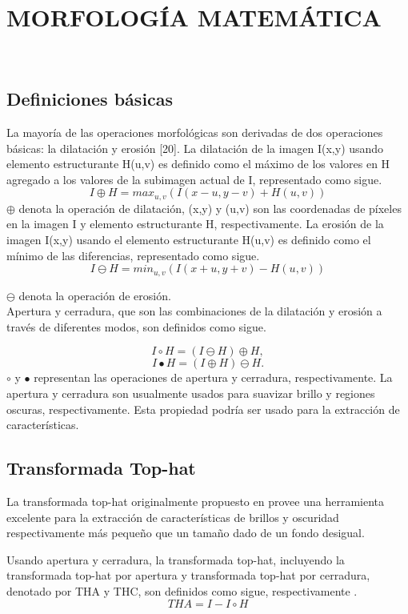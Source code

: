 \documentclass[a4paper, 11 pt, conference]{ieeeconf}      %
\begin{document}
\section{MORFOLOG\'IA MATEM\'ATICA}
\\
\subsection{Definiciones b\'asicas}

La mayor\'ia de las operaciones morfol\'ogicas son derivadas de dos operaciones b\'asicas: la dilataci\'on y erosi\'on [20]. La dilataci\'on de la imagen I(x,y) usando elemento estructurante H(u,v) es definido como el m\'aximo de los valores en H agregado a los valores de la subimagen actual de I, representado como  sigue.
$$
I\oplus H = max_{u,v}(I(x-u,y-v) + H(u,v)) 
$$
\( \oplus \) denota la operaci\'on de dilataci\'on, (x,y) y (u,v) son las coordenadas de p\'ixeles en la imagen I y elemento estructurante H, respectivamente. La erosi\'on de la imagen I(x,y) usando el elemento estructurante H(u,v) es definido como el m\'inimo de las diferencias, representado como sigue.
$$
I \ominus H = min_{u,v}(I(x+u,y+v)-H(u,v))
$$

\( \ominus \) denota la  operaci\'on de erosi\'on. \\
Apertura y cerradura, que son las combinaciones de la dilataci\'on y erosi\'on a trav\'es de diferentes modos, son definidos como sigue.

$$
I \circ H = (I \ominus H) \oplus H,
$$
$$
I \bullet H = (I \oplus H) \ominus H.
$$
$ \circ $ y $ \bullet $ representan las operaciones de apertura y cerradura, respectivamente.
La apertura y cerradura son usualmente usados para suavizar brillo y regiones oscuras, respectivamente. Esta propiedad podr\'ia ser usado para la extracci\'on de caracter\'isticas.

\subsection{Transformada Top-hat}
La transformada top-hat originalmente propuesto en \cite{20} provee una herramienta excelente para la extracci\'on de caracter\'isticas de brillos y oscuridad respectivamente m\'as pequeño que un tamaño dado de un fondo desigual.

Usando apertura y cerradura, la transformada top-hat, incluyendo la transformada top-hat por apertura y transformada top-hat por cerradura, denotado por THA y THC, son definidos como sigue, respectivamente \cite{17}.
$$
THA = I - I \circ H
$$
\end{document}
